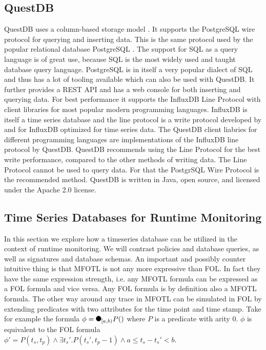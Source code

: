 \subsection{QuestDB}
QuestDB uses a column-based storage model \cite{questdb-storage-model}.
It supports the PostgreSQL wire protocol \cite{questdb-postgres-wire} for querying and inserting data.
This is the same protocol used by the popular relational database PostgreSQL \cite{postgres}.
The support for SQL as a query language is of great use, because SQL is the most widely used and taught database query language.
PostgreSQL is in itself a very popular dialect of SQL and thus has a lot of tooling available which can also be used with QuestDB.
It further provides a REST API \cite{questdb-rest} and has a web console for both inserting and querying data.
For best performance it supports the InfluxDB Line Protocol \cite{questdb-influx-db-line-protocol, influx-line} with client libraries for most popular modern programming languages.
InfluxDB is itself a time series database and the line protocol is a write protocol developed by and for InfluxDB optimized for time series data.
The QuestDB client liabries for different programming languages are implementations of the InfluxDB line protocol by QuestDB.
QuestDB recommends using the Line Protocol for the best write performance, compared to the other methods of writing data.
The Line Protocol cannot be used to query data.
For that the PostgrSQL Wire Protocol is the recommended method.
QuestDB is written in Java, open source, and licensed under the Apache 2.0 license.

\subsection{Time Series Databases for Runtime Monitoring}
In this section we explore how a timeseries database can be utilized in the context of runtime monitoring.
We will contrast policies and database queries, as well as signatures and database schemas.
An important and possibly counter intuitive thing is that MFOTL is not any more expressive than FOL.
In fact they have the same expression strength, i.e. any MFOTL formula can be expressed as a FOL formula and vice versa.
Any FOL formula is by definition also a MFOTL formula.
The other way around any trace in MFOTL can be simulated in FOL by extending predicates with two attributes for the time point and time stamp.
Take for example the formula $\phi = \Previous{[a,b)} P()$ where $P$ is a predicate with arity $0$.
$\phi$ is equivalent to the FOL formula $\phi' = P(t_s, t_p) \land \exists t_s' . P(t_s', t_p - 1) \land a \leq t_s - t_s' < b$.

